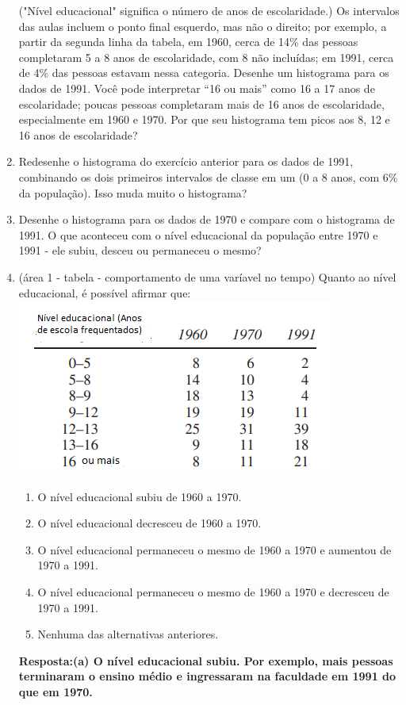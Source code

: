 \documentclass[12pt]{article}\documentclass[brazilian,12pt,a4paper,final]{article}
\begin{document}
\begin{enumerate}
("Nível educacional" significa o número de anos de escolaridade.) Os intervalos das aulas incluem o ponto final esquerdo,
mas não o direito; por exemplo, a partir da segunda linha da tabela, em 1960, cerca de 
14\% das pessoas completaram 5 a 8 anos de escolaridade, com 8 não incluídas; em 1991,
cerca de 4\% das pessoas estavam nessa categoria. Desenhe um histograma para os dados de 1991.
Você pode interpretar “16 ou mais” como 16 a 17 anos de escolaridade; poucas pessoas
completaram mais de 16 anos de escolaridade, especialmente em 1960 e 1970. Por que
seu histograma tem picos aos 8, 12 e 16 anos de escolaridade?


\item Redesenhe o histograma do exercício anterior para os dados de 1991, combinando os dois primeiros intervalos de classe em
um (0 a 8 anos, com 6\% da população). Isso muda muito o histograma?

\item 
Desenhe o histograma para os dados de 1970 e compare com o histograma de 1991. O que
aconteceu com o nível educacional da população entre 1970 e 1991 - ele subiu, desceu ou permaneceu o mesmo?
\fi 

\item 
(área 1 - tabela - comportamento de uma varíavel no tempo) Quanto ao nível educacional, é possível afirmar que:
\includegraphics{Figuras/3B1.png}
\begin{enumerate}[label=(\alph*)]
\item O nível educacional subiu de 1960 a 1970. 
\item O nível educacional decresceu de 1960 a 1970.
\item O nível educacional permaneceu o mesmo de 1960 a 1970 e aumentou de 1970 a 1991.
\item O nível educacional permaneceu o mesmo de 1960 a 1970 e decresceu de 1970 a 1991.
\item Nenhuma das alternativas anteriores.
\end{enumerate}
\textbf{Resposta:(a) O nível educacional subiu. Por exemplo, mais pessoas terminaram o ensino médio e
ingressaram na faculdade em 1991 do que em 1970.
}


\end{enumerate}
\end{document}
